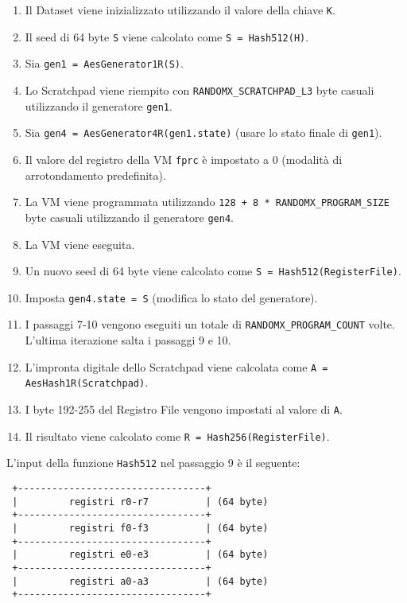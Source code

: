 \begin{enumerate}
    \item Il Dataset viene inizializzato utilizzando il valore della chiave \texttt{K}.
    \item Il seed di 64 byte \texttt{S} viene calcolato come \texttt{S = Hash512(H)}.
    \item Sia \texttt{gen1 = AesGenerator1R(S)}.
    \item Lo Scratchpad viene riempito con \texttt{RANDOMX\_SCRATCHPAD\_L3} byte casuali utilizzando il generatore \texttt{gen1}.
    \item Sia \texttt{gen4 = AesGenerator4R(gen1.state)} (usare lo stato finale di \texttt{gen1}).
    \item Il valore del registro della VM \texttt{fprc} è impostato a 0 (modalità di arrotondamento predefinita).
    \item La VM viene programmata utilizzando \texttt{128 + 8 * RANDOMX\_PROGRAM\_SIZE} byte casuali utilizzando il generatore \texttt{gen4}.
    \item La VM viene eseguita.
    \item Un nuovo seed di 64 byte viene calcolato come \texttt{S = Hash512(RegisterFile)}.
    \item Imposta \texttt{gen4.state = S} (modifica lo stato del generatore).
    \item I passaggi 7-10 vengono eseguiti un totale di \texttt{RANDOMX\_PROGRAM\_COUNT} volte. L'ultima iterazione salta i passaggi 9 e 10.
    \item L'impronta digitale dello Scratchpad viene calcolata come \texttt{A = AesHash1R(Scratchpad)}.
    \item I byte 192-255 del Registro File vengono impostati al valore di \texttt{A}.
    \item Il risultato viene calcolato come \texttt{R = Hash256(RegisterFile)}.
\end{enumerate}

L'input della funzione \texttt{Hash512} nel passaggio 9 è il seguente:

\begin{verbatim}
 +---------------------------------+
 |         registri r0-r7          | (64 byte)
 +---------------------------------+
 |         registri f0-f3          | (64 byte)
 +---------------------------------+
 |         registri e0-e3          | (64 byte)
 +---------------------------------+
 |         registri a0-a3          | (64 byte)
 +---------------------------------+
\end{verbatim}

